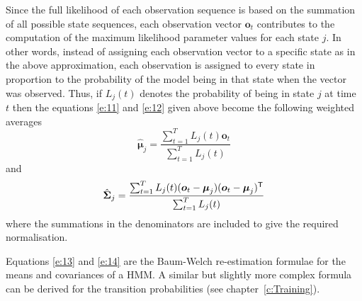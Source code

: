 Since the full likelihood of each observation sequence
is based on the summation of all possible state sequences,
each observation vector $\bm{o}_t$ contributes to the computation
of the maximum likelihood parameter values for each state $j$.
In other words, instead of assigning each observation vector
to a specific state as in the above approximation, each
observation is assigned to every state in proportion to
the probability of the model being in that state when the
vector was observed.  Thus, if $L_j(t)$ denotes the probability
of being in state $j$ at time $t$ then the 
equations \ref{e:11} and \ref{e:12} given above become the
following weighted averages
\begin{equation} \label{e:13}
   \hat{\bm{\mu}}_j = \frac{ \sum_{t=1}^{T} L_j(t) \bm{o}_t}
                          {\sum_{t=1}^{T} L_j(t)}
\end{equation}
and
\begin{equation} \label{e:14}
   \hat{{\mbox{\boldmath $\Sigma$}}}_j = \frac{ \sum_{t=1}^{T} L_j(t)
        ({\mbox{\boldmath $o$}}_t - {\mbox{\boldmath $\mu$}}_j) ({\mbox{\boldmath $o$}}_t - {\mbox{\boldmath $\mu$}}_j)^{\scriptstyle\sf T} }
                      {\sum_{t=1}^{T} L_j(t)}
\end{equation}
where the summations in the denominators are included to give
the required normalisation.

Equations \ref{e:13} and \ref{e:14} are the 
Baum-Welch re-estimation
formulae for the means and covariances of a HMM.  A similar but
slightly more complex formula can be derived for the transition
probabilities (see chapter~\ref{c:Training}).

